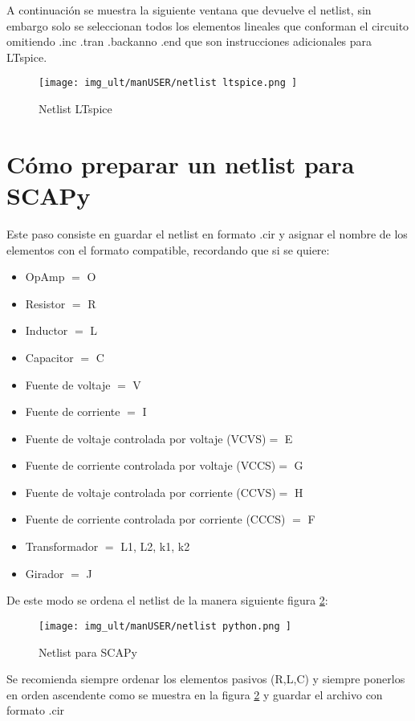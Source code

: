 A continuación se muestra la siguiente ventana que devuelve el netlist, sin embargo solo se seleccionan todos los elementos lineales que conforman el circuito omitiendo .inc .tran .backanno .end que son instrucciones adicionales para LTspice.

\begin{figure}[H]
	\centering\texttt{[image: img\_ult/manUSER/netlist ltspice.png
	]}
	\caption{Netlist LTspice}
	\label{img:netlist LTspice}
\end{figure} 

\section{Cómo preparar un netlist para SCAPy} 
Este paso consiste en guardar el netlist en formato .cir y asignar el nombre de los elementos con el formato compatible, recordando que si se quiere:
\begin{itemize}
	\item OpAmp $=$ O
	\item Resistor $=$ R
	\item Inductor $=$ L
	\item Capacitor $=$ C
	\item Fuente de voltaje $=$ V
	\item Fuente de corriente $=$ I
	\item Fuente de voltaje controlada por voltaje (VCVS)$=$ E
	\item Fuente de corriente controlada por voltaje (VCCS)$=$ G
	\item Fuente de voltaje controlada por corriente (CCVS)$=$ H
	\item Fuente de corriente controlada por corriente (CCCS) $=$ F
	\item Transformador $=$ L1, L2, k1, k2
	\item Girador $=$ J
\end{itemize}

De este modo se ordena el netlist de la manera siguiente figura \ref{img:netlist python}: 

\begin{figure}[H]
	\centering\texttt{[image: img\_ult/manUSER/netlist python.png
	]}
	\caption{Netlist para SCAPy}
	\label{img:netlist python}
\end{figure} 

Se recomienda siempre ordenar los elementos pasivos (R,L,C) y siempre ponerlos en orden ascendente como se muestra en la figura \ref{img:netlist python} y guardar el archivo con formato .cir 

